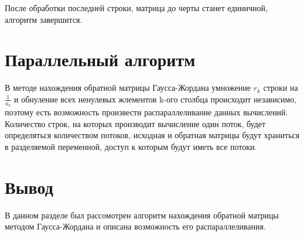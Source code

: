 После обработки последней строки, матрица до черты станет единичной, алгоритм завершится.~\cite{gauss}

\section{Параллельный алгоритм}

В методе нахождения обратной матрицы Гаусса-Жордана умножение $r_{k}$ строки на $\frac{1}{a_{k}}$ 
и обнуление всех ненулевых жлементов k-ого столбца происходит независимо, поэтому есть
возможность произвести распараллеливание данных вычислений. Количество
строк, на которых производит вычисление один поток, будет определяться
количеством потоков, исходная и обратная матрицы будут храниться в
разделяемой переменной, доступ к которым будут иметь все потоки.

\section*{Вывод}
В данном разделе был рассомотрен алгоритм нахождения обратной матрицы методом Гаусса-Жордана
и описана возможность его распараллеливания.

